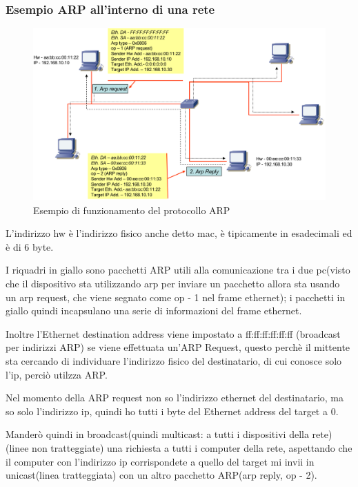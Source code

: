 \subsubsection{Esempio ARP all'interno di una rete}

\begin{figure}[h!]
    \centering
    \includegraphics[width=1\textwidth]{images/esempioarp.png}
    \caption{Esempio di funzionamento del protocollo ARP}
    \label{fig:esempioARP}
\end{figure}

L'indirizzo hw è l'indirizzo fisico anche detto mac, è tipicamente in esadecimali ed è di 6 byte.

I riquadri in giallo sono pacchetti ARP utili alla comunicazione tra i due pc(visto che il dispositivo sta utilizzando arp per inviare un pacchetto allora sta usando un arp request, che viene segnato come op - 1 nel frame ethernet); i pacchetti in giallo quindi incapsulano una serie di informazioni del frame ethernet. 

Inoltre l'Ethernet destination address viene impostato a ff:ff:ff:ff:ff:ff (broadcast per indirizzi ARP) se viene effettuata un'ARP Request, questo perchè il mittente sta cercando di individuare l'indirizzo fisico del destinatario, di cui conosce solo l'ip, perciò utilzza ARP.

Nel momento della ARP request non so l'indirizzo ethernet del destinatario, ma so solo l'indirizzo ip, quindi ho tutti i byte del Ethernet address del target a 0.

Manderò quindi in broadcast(quindi multicast: a tutti i dispositivi della rete)(linee non tratteggiate) una richiesta a tutti i computer della rete, aspettando che il computer con l'indirizzo ip corrispondete a quello del target mi invii in unicast(linea tratteggiata) con un altro pacchetto ARP(arp reply, op - 2).

